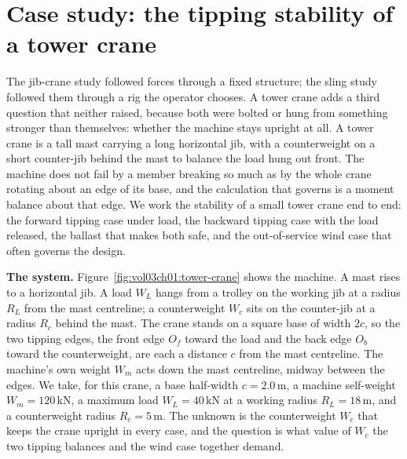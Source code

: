 \section{Case study: the tipping stability of a tower crane}

The jib-crane study followed forces through a fixed structure; the sling
study followed them through a rig the operator chooses. A tower crane adds a
third question that neither raised, because both were bolted or hung from
something stronger than themselves: whether the machine stays upright at all.
A tower crane is a tall mast carrying a long horizontal jib, with a
counterweight on a short counter-jib behind the mast to balance the load
hung out front. The machine does not fail by a member breaking so much as by
the whole crane rotating about an edge of its base, and the calculation that
governs is a moment balance about that edge. We work the stability of a small
tower crane end to end: the forward tipping case under load, the backward
tipping case with the load released, the ballast that makes both safe, and
the out-of-service wind case that often governs the design.



\textbf{The system.} Figure~\ref{fig:vol03ch01:tower-crane} shows the
machine. A mast rises to a horizontal jib. A load $W_L$ hangs from a trolley
on the working jib at a radius $R_L$ from the mast centreline; a
counterweight $W_c$ sits on the counter-jib at a radius $R_c$ behind the
mast. The crane stands on a square base of width $2c$, so the two tipping
edges, the front edge $O_f$ toward the load and the back edge $O_b$ toward
the counterweight, are each a distance $c$ from the mast centreline. The
machine's own weight $W_m$ acts down the mast centreline, midway between the
edges. We take, for this crane, a base half-width $c = 2.0\,\si{\meter}$, a
machine self-weight $W_m = 120\,\text{kN}$, a maximum load $W_L = 40\,\text{kN}$
at a working radius $R_L = 18\,\si{\meter}$, and a counterweight radius $R_c
= 5\,\si{\meter}$. The unknown is the counterweight $W_c$ that keeps the crane
upright in every case, and the question is what value of $W_c$ the two tipping
balances and the wind case together demand.

